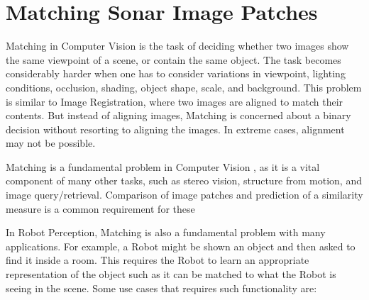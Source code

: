 \chapter{Matching Sonar Image Patches}
\label{chapter:matching}

Matching in Computer Vision is the task of deciding whether two images show the same viewpoint of a scene, or contain the same object. The task becomes considerably harder when one has to consider variations in viewpoint, lighting conditions, occlusion, shading, object shape, scale, and background. This problem is similar to Image Registration, where two images are aligned to match their contents. But instead of aligning images, Matching is concerned about a binary decision without resorting to aligning the images. In extreme cases, alignment may not be possible.

Matching is a fundamental problem in Computer Vision \cite{szeliski2010computer}, as it is a vital component of many other tasks, such as stereo vision, structure from motion, and image query/retrieval. Comparison of image patches and prediction of a similarity measure is a common requirement for these

In Robot Perception, Matching is also a fundamental problem with many applications. For example, a Robot might be shown an object and then asked to find it inside a room. This requires the Robot to learn an appropriate representation of the object such as it can be matched to what the Robot is seeing in the scene. Some use cases that requires such functionality are:

